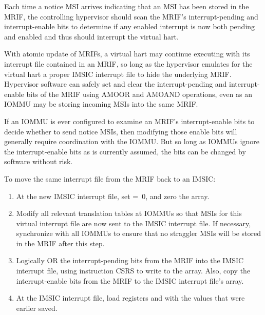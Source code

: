 Each time a notice MSI arrives indicating that an MSI has been
stored in the MRIF, the controlling hypervisor should scan the MRIF's
interrupt-pending and interrupt-enable bits to determine if any enabled
interrupt is now both pending and enabled and thus should interrupt the
virtual hart.

With atomic update of MRIFs, a virtual hart may continue executing
with its interrupt file contained in an MRIF, so long as the hypervisor
emulates for the virtual hart a proper IMSIC interrupt file to hide the
underlying MRIF.
Hypervisor software can safely set and clear the interrupt-pending and
interrupt-enable bits of the MRIF using AMOOR and AMOAND operations,
even as an \mbox{IOMMU} may be storing incoming MSIs into the same MRIF.

\begin{commentary}
If an \mbox{IOMMU} is ever configured to examine an MRIF's interrupt-enable
bits to decide whether to send notice MSIs, then modifying those enable
bits will generally require coordination with the \mbox{IOMMU}.
But so long as \mbox{IOMMU}s ignore the interrupt-enable bits as is
currently assumed, the bits can be changed by software without risk.
\end{commentary}

To move the same interrupt file from the MRIF back to an IMSIC:
\begin{enumerate}

\item
At the new IMSIC interrupt file, set  =~0, and zero the
 array.

\item
Modify all relevant translation tables at \mbox{IOMMU}s so that MSIs for
this virtual interrupt file are now sent to the IMSIC interrupt file.
If necessary, synchronize with all \mbox{IOMMU}s to ensure that no straggler
MSIs will be stored in the MRIF after this step.

\item
Logically OR the interrupt-pending bits from the MRIF into the IMSIC
interrupt file, using instruction CSRS to write to the  array.
Also, copy the interrupt-enable bits from the MRIF to the IMSIC
interrupt file's  array.

\item
At the IMSIC interrupt file, load registers  and
 with the values that were earlier saved.

\end{enumerate}

